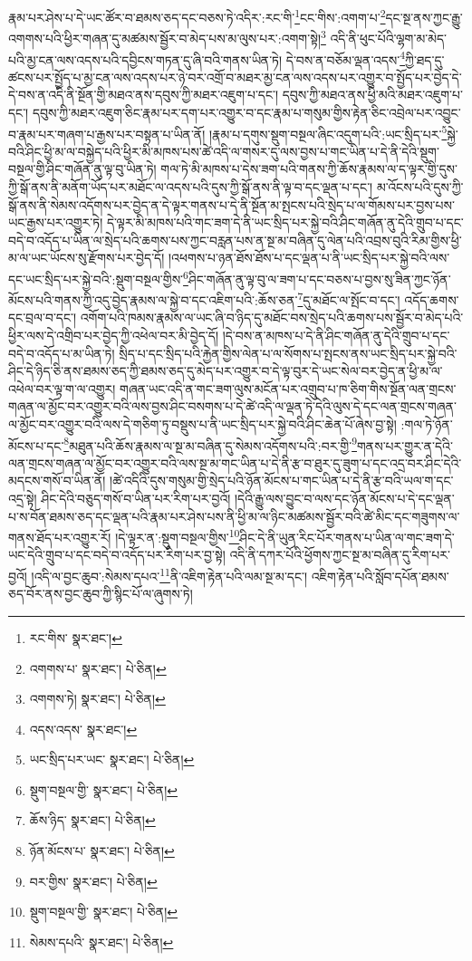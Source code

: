 རྣམ་པར་ཤེས་པ་དེ་ཡང་ཚོར་བ་ཐམས་ཅད་དང་བཅས་ཏེ་འདིར་:རང་གི་\footnote{རང་གིས་  སྣར་ཐང་། }ངང་གིས་:འགག་པ་\footnote{འགགས་པ་  སྣར་ཐང་།  པེ་ཅིན། }དང་སྔ་ནས་ཀྱང་རྒྱུ་འགགས་པའི་ཕྱིར་གཞན་དུ་མཚམས་སྦྱོར་བ་མེད་པས་མ་ལུས་པར་:འགག་སྟེ།\footnote{འགགས་ཏེ།  སྣར་ཐང་།  པེ་ཅིན། } འདི་ནི་ཕུང་པོའི་ལྷག་མ་མེད་པའི་མྱ་ངན་ལས་འདས་པའི་དབྱིངས་གཏན་དུ་ཞི་བའི་གནས་ཡིན་ཏེ། དེ་བས་ན་བཅོམ་ལྡན་འདས་\footnote{འདས་འདས་  སྣར་ཐང་། }ཀྱི་ཐད་དུ་ཚངས་པར་སྤྱོད་པ་མྱ་ངན་ལས་འདས་པར་ཉེ་བར་འགྲོ་བ་མཐར་མྱ་ངན་ལས་འདས་པར་འགྱུར་བ་སྤྱོད་པར་བྱེད་དེ་དེ་བས་ན་འདི་ནི་སྔོན་གྱི་མཐའ་ནས་དབུས་ཀྱི་མཐར་འཇུག་པ་དང་། དབུས་ཀྱི་མཐའ་ནས་ཕྱི་མའི་མཐར་འཇུག་པ་དང་། དབུས་ཀྱི་མཐར་འཇུག་ཅིང་རྣམ་པར་དག་པར་འགྱུར་བ་དང་རྣམ་པ་གསུམ་གྱིས་རྟེན་ཅིང་འབྲེལ་པར་འབྱུང་བ་རྣམ་པར་གཞག་པ་རྒྱས་པར་བསྟན་པ་ཡིན་ནོ། །རྣམ་པ་དགུས་སྡུག་བསྔལ་ཞིང་འདུག་པའི་:ཡང་སྲིད་པར་\footnote{ཡང་སྲིད་པར་ཡང་  སྣར་ཐང་།  པེ་ཅིན། }སྐྱེ་བའི་ཤིང་ཕྱི་མ་ལ་བསྐྱེད་པའི་ཕྱིར་མི་མཁས་པས་ཚེ་འདི་ལ་གསར་དུ་ལས་བྱས་པ་གང་ཡིན་པ་དེ་ནི་དེའི་སྡུག་བསྔལ་གྱི་ཤིང་གཞོན་ནུ་ལྟ་བུ་ཡིན་ཏེ། གལ་ཏེ་མི་མཁས་པ་དེས་ཟག་པའི་གནས་ཀྱི་ཆོས་རྣམས་ལ་ད་ལྟར་གྱི་དུས་ཀྱི་སྒོ་ནས་ནི་མནོག་ཡོད་པར་མཐོང་ལ་འདས་པའི་དུས་ཀྱི་སྒོ་ནས་ནི་ལྟ་བ་དང་ལྡན་པ་དང་། མ་འོངས་པའི་དུས་ཀྱི་སྒོ་ནས་ནི་སེམས་འདོགས་པར་བྱེད་ན་དེ་ལྟར་གནས་པ་དེ་ནི་སྔོན་མ་སྤངས་པའི་སྲེད་པ་ལ་གོམས་པར་བྱས་པས་ཡང་རྒྱས་པར་འགྱུར་ཏེ། དེ་ལྟར་མི་མཁས་པའི་གང་ཟག་དེ་ནི་ཡང་སྲིད་པར་སྐྱེ་བའི་ཤིང་གཞོན་ནུ་དེའི་གྲུབ་པ་དང་བདེ་བ་འདོད་པ་ཡིན་ལ་སྲེད་པའི་ཆགས་པས་ཀྱང་བརླན་པས་ན་སྔ་མ་བཞིན་དུ་ལེན་པའི་འབྲས་བུའི་རིམ་གྱིས་ཕྱི་མ་ལ་ཡང་ཡོངས་སུ་རྫོགས་པར་བྱེད་དོ། །འཕགས་པ་ཉན་ཐོས་ཐོས་པ་དང་ལྡན་པ་ནི་ཡང་སྲིད་པར་སྐྱེ་བའི་ལས་དང་ཡང་སྲིད་པར་སྐྱེ་བའི་:སྡུག་བསྔལ་གྱིས་\footnote{སྡུག་བསྔལ་གྱི་  སྣར་ཐང་།  པེ་ཅིན། }ཤིང་གཞོན་ནུ་ལྟ་བུ་ལ་ཟག་པ་དང་བཅས་པ་བྱས་སུ་ཟིན་ཀྱང་ཉོན་མོངས་པའི་གནས་ཀྱི་འདུ་བྱེད་རྣམས་ལ་སྐྱེ་བ་དང་འཇིག་པའི་:ཆོས་ཅན་\footnote{ཆོས་ཉིད་  སྣར་ཐང་།  པེ་ཅིན། }དུ་མཐོང་ལ་སྤོང་བ་དང་། འདོད་ཆགས་དང་བྲལ་བ་དང་། འགོག་པའི་ཁམས་རྣམས་ལ་ཡང་ཞི་བ་ཉིད་དུ་མཐོང་བས་སྲེད་པའི་ཆགས་པས་སྦྱོར་བ་མེད་པའི་ཕྱིར་ལས་དེ་འགྲིབ་པར་བྱེད་ཀྱི་འཕེལ་བར་མི་བྱེད་དོ། །དེ་བས་ན་མཁས་པ་དེ་ནི་ཤིང་གཞོན་ནུ་དེའི་གྲུབ་པ་དང་བདེ་བ་འདོད་པ་མ་ཡིན་ཏེ། སྲིད་པ་དང་སྲིད་པའི་རྐྱེན་གྱིས་ལེན་པ་ལ་སོགས་པ་སྤངས་ནས་ཡང་སྲིད་པར་སྐྱེ་བའི་ཤིང་དེ་ཉིད་ཅི་ནས་ཐམས་ཅད་ཀྱི་ཐམས་ཅད་དུ་མེད་པར་འགྱུར་བ་དེ་ལྟ་བུར་དེ་ཡང་སེལ་བར་བྱེད་ན་ཕྱི་མ་ལ་འཕེལ་བར་ལྟ་ག་ལ་འགྱུར། གཞན་ཡང་འདི་ན་གང་ཟག་ལུས་མངོན་པར་འགྲུབ་པ་ཁ་ཅིག་གིས་སྔོན་ལན་གྲངས་གཞན་ལ་མྱོང་བར་འགྱུར་བའི་ལས་བྱས་ཤིང་བསགས་པ་དེ་ཚེ་འདི་ལ་ལྡན་ཏེ་དེའི་ལུས་དེ་དང་ལན་གྲངས་གཞན་ལ་མྱོང་བར་འགྱུར་བའི་ལས་དེ་གཅིག་ཏུ་བསྡུས་པ་ནི་ཡང་སྲིད་པར་སྐྱེ་བའི་ཤིང་ཆེན་པོ་ཞེས་བྱ་སྟེ། :གལ་ཏེ་ཉོན་མོངས་པ་དང་\footnote{ཉོན་མོངས་པ་  སྣར་ཐང་།  པེ་ཅིན། }མཐུན་པའི་ཆོས་རྣམས་ལ་སྔ་མ་བཞིན་དུ་སེམས་འདོགས་པའི་:བར་གྱི་\footnote{བར་གྱིས་  སྣར་ཐང་།  པེ་ཅིན། }གནས་པར་གྱུར་ན་དེའི་ལན་གྲངས་གཞན་ལ་མྱོང་བར་འགྱུར་བའི་ལས་སྔ་མ་གང་ཡིན་པ་དེ་ནི་རྩ་བ་ཐུར་དུ་ཟུག་པ་དང་འདྲ་བར་ཤིང་དེའི་མདངས་གསོ་བ་ཡིན་ནོ། །ཚེ་འདིའི་དུས་གསུམ་གྱི་སྲེད་པའི་ཉོན་མོངས་པ་གང་ཡིན་པ་དེ་ནི་རྩ་བའི་ཡལ་ག་དང་འདྲ་སྟེ། ཤིང་དེའི་བཅུད་གསོ་བ་ཡིན་པར་རིག་པར་བྱའོ། །དེའི་རྒྱུ་ལས་བྱུང་བ་ལས་དང་ཉོན་མོངས་པ་དེ་དང་ལྡན་པ་ས་བོན་ཐམས་ཅད་དང་ལྡན་པའི་རྣམ་པར་ཤེས་པས་ནི་ཕྱི་མ་ལ་ཉིང་མཚམས་སྦྱོར་བའི་ཚེ་མིང་དང་གཟུགས་ལ་གནས་ཐོད་པར་འགྱུར་རོ། །དེ་ལྟར་ན་:སྡུག་བསྔལ་གྱིས་\footnote{སྡུག་བསྔལ་གྱི་  སྣར་ཐང་།  པེ་ཅིན། }ཤིང་དེ་ནི་ཡུན་རིང་པོར་གནས་པ་ཡིན་ལ་གང་ཟག་དེ་ཡང་དེའི་གྲུབ་པ་དང་བདེ་བ་འདོད་པར་རིག་པར་བྱ་སྟེ། འདི་ནི་དཀར་པོའི་ཕྱོགས་ཀྱང་སྔ་མ་བཞིན་དུ་རིག་པར་བྱའོ། །འདི་ལ་བྱང་ཆུབ་:སེམས་དཔའ་\footnote{སེམས་དཔའི་  སྣར་ཐང་།  པེ་ཅིན། }ནི་འཇིག་རྟེན་པའི་ལམ་སྔ་མ་དང་། འཇིག་རྟེན་པའི་སློབ་དཔོན་ཐམས་ཅད་བོར་ནས་བྱང་ཆུབ་ཀྱི་སྙིང་པོ་ལ་ཞུགས་ཏེ། 